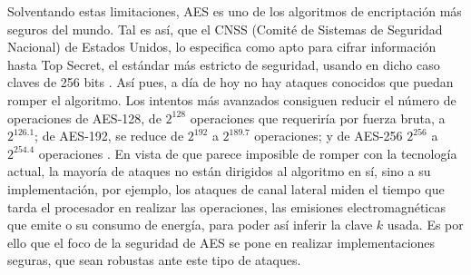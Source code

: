 \begin{Revision}
    Solventando estas limitaciones, AES es uno de los algoritmos de encriptación más seguros del mundo. Tal es así, que el CNSS (Comité de Sistemas de Seguridad Nacional) de Estados Unidos, lo especifica como apto para cifrar información hasta Top Secret, el estándar más estricto de seguridad, usando en dicho caso claves de 256 bits \cite{cnssp15_2016}. Así pues, a día de hoy no hay ataques conocidos que puedan romper el algoritmo. Los intentos más avanzados consiguen reducir el número de operaciones de AES-128, de $2^{128}$ operaciones que requeriría por fuerza bruta, a $2^{126.1}$; de AES-192, se reduce de $2^{192}$ a $2^{189.7}$ operaciones; y de AES-256 $2^{256}$ a $2^{254.4}$ operaciones \cite{bogdanov2011biclique}. En vista de que parece imposible de romper con la tecnología actual, la mayoría de ataques no están dirigidos al algoritmo en sí, sino a su implementación, por ejemplo, los ataques de canal lateral miden el tiempo que tarda el procesador en realizar las operaciones, las emisiones electromagnéticas que emite o su consumo de energía, para poder así inferir la clave $k$ usada. Es por ello que el foco de la seguridad de AES se pone en realizar implementaciones seguras, que sean robustas ante este tipo de ataques.
\end{Revision}
